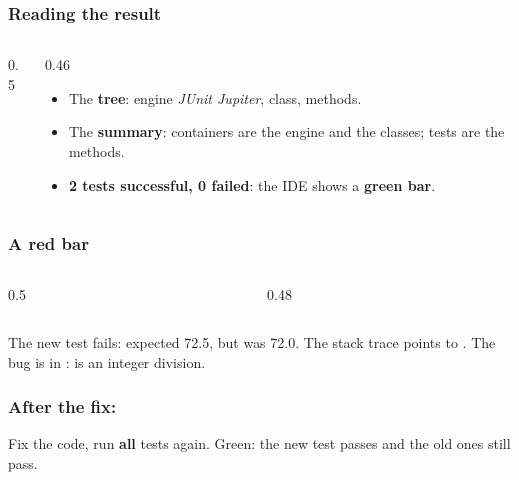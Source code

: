 \documentclass[aspectratio=169,10pt,compress]{beamer}
\begin{document}
\begin{frame}[t,fragile] \frametitle{Reading the result}
  \begin{columns}[T]
    \begin{column}{0.5\textwidth}
    \end{column}
    \begin{column}{0.46\textwidth}
      \begin{itemize}\small
        \item The \textbf{tree}: engine \emph{JUnit Jupiter}, class, methods.
        \item The \textbf{summary}: containers are the engine and the classes; tests are the methods.
        \item \textbf{2 tests successful, 0 failed}: the IDE shows a \textbf{green bar}.
      \end{itemize}
    \end{column}
  \end{columns}
\end{frame}




\begin{frame}[t,fragile] \frametitle{A red bar}
  \begin{columns}[T]
    \begin{column}{0.5\textwidth}
    \end{column}
    \begin{column}{0.48\textwidth}
    \end{column}
  \end{columns}

  \vspace{0.2em}
  \small The new test fails: expected 72.5, but was 72.0. The stack trace points to .
  The bug is in :  is an integer division.
\end{frame}




\begin{frame}[t,fragile] \frametitle{After the fix: }

  \vspace{0.1em}
  \small
  Fix the code, run \textbf{all} tests again. Green: the new test passes and the old ones still pass.
\end{frame}
\end{document}
